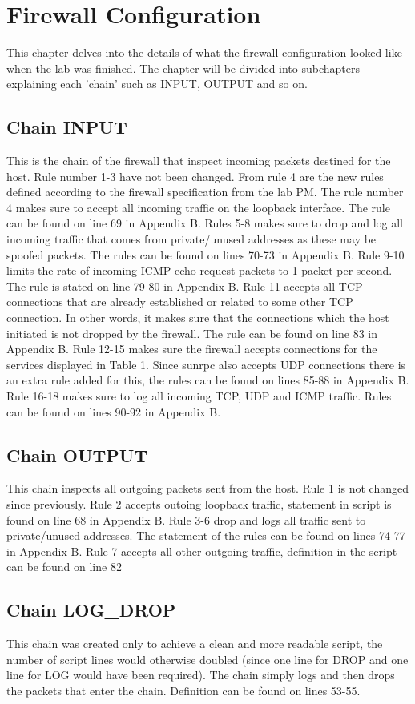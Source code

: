 \section{Firewall Configuration}
\label{sec:config}
This chapter delves into the details of what the firewall configuration looked like when the lab was finished. The chapter will be divided into subchapters explaining each 'chain' such as INPUT, OUTPUT and so on.
\subsection{Chain INPUT}
This is the chain of the firewall that inspect incoming packets destined for the host. Rule number 1-3 have not been changed. From rule 4  are the new rules defined according to the firewall specification from the lab PM. The rule number 4 makes sure to accept all incoming traffic on the loopback interface. The rule can be found on line 69 in Appendix B. Rules 5-8 makes sure to drop and log all incoming traffic that comes from private/unused addresses as these may be spoofed packets. The rules can be found on lines 70-73 in Appendix B. Rule 9-10 limits the rate of incoming ICMP echo request packets to 1 packet per second. The rule is stated on line 79-80 in Appendix B. Rule 11 accepts all TCP connections that are already established or related to some other TCP connection. In other words, it makes sure that the connections which the host initiated is not dropped by the firewall. The rule can be found on line 83 in Appendix B. Rule 12-15 makes sure the firewall accepts connections for the services displayed in Table 1. Since sunrpc also accepts UDP connections there is an extra rule added for this, the rules can be found on lines 85-88 in Appendix B. Rule 16-18 makes sure to log all incoming TCP, UDP and ICMP traffic. Rules can be found on lines 90-92 in Appendix B.

\subsection{Chain OUTPUT}
This chain inspects all outgoing packets sent from the host. Rule 1 is not changed since previously. Rule 2 accepts outoing loopback traffic, statement in script is found on line 68 in Appendix B. Rule 3-6 drop and logs all traffic sent to private/unused addresses. The statement of the rules can be found on lines 74-77 in Appendix B. Rule 7 accepts all other outgoing traffic, definition in the script can be found on line 82

\subsection{Chain LOG_DROP}
This chain was created only to achieve a clean and more readable script, the number of script lines would otherwise doubled (since one line for DROP and one line for LOG would have been required). The chain simply logs and then drops the packets that enter the chain. Definition can be found on lines 53-55.


